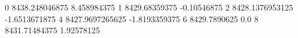 0 8438.248046875 8.458984375
1 8429.68359375 -0.10546875
2 8428.1376953125 -1.6513671875
4 8427.9697265625 -1.8193359375
6 8429.7890625 0.0
8 8431.71484375 1.92578125

